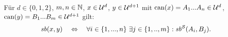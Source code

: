 \begin{dfn}[$\Gsb$]\ \\
    Für $d \in \{0,1,2\}$, $m,n \in \mathbb{N}$, $x \in \mathcal{U}^d$, $y \in \mathcal{U}^{d+1}$ mit $\text{can}(x) = A_1 ... A_n \in \mathcal{U}^d$, $\text{can}(y) = B_1 ... B_m \in \mathcal{U}^{d+1}$ gilt:
    \begin{align*}
        \mathit{sb}(x,y) \quad \Leftrightarrow \quad \forall i \in \{1, ..., n\}\ \exists j \in \{1, .., m\}: \mathit{sb}^{\mathcal{S}}(A_i,B_j).
    \end{align*}
\end{dfn}







